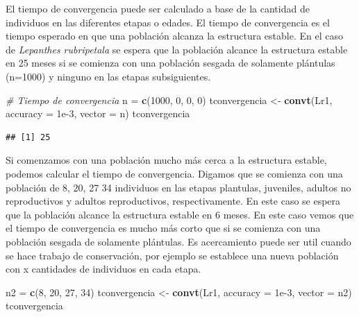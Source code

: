 \documentclass[
]{book}
\newenvironment{Shaded}{\begin{snugshade}}{\end{snugshade}}
\newcommand{\AttributeTok}[1]{\textcolor[rgb]{0.13,0.29,0.53}{#1}}
\newcommand{\CommentTok}[1]{\textcolor[rgb]{0.56,0.35,0.01}{\textit{#1}}}
\newcommand{\DecValTok}[1]{\textcolor[rgb]{0.00,0.00,0.81}{#1}}
\newcommand{\FloatTok}[1]{\textcolor[rgb]{0.00,0.00,0.81}{#1}}
\newcommand{\FunctionTok}[1]{\textcolor[rgb]{0.13,0.29,0.53}{\textbf{#1}}}
\newcommand{\NormalTok}[1]{#1}
\newcommand{\OtherTok}[1]{\textcolor[rgb]{0.56,0.35,0.01}{#1}}
\theoremstyle{definition}
\theoremstyle{definition}
\theoremstyle{definition}
\theoremstyle{definition}
\theoremstyle{remark}
\begin{document}
El tiempo de convergencia puede ser calculado a base de la cantidad de individuos en las diferentes etapas o edades. El tiempo de convergencia es el tiempo esperado en que una población alcanza la estructura estable. En el caso de \emph{Lepanthes rubripetala} se espera que la población alcance la estructura estable en 25 meses si se comienza con una población sesgada de solamente plántulas (n=1000) y ninguno en las etapas subsiguientes.

\begin{Shaded}
\begin{Highlighting}[]
\CommentTok{\# Tiempo de convergencia}
\NormalTok{n }\OtherTok{=} \FunctionTok{c}\NormalTok{(}\DecValTok{1000}\NormalTok{, }\DecValTok{0}\NormalTok{, }\DecValTok{0}\NormalTok{, }\DecValTok{0}\NormalTok{)}
\NormalTok{tconvergencia }\OtherTok{\textless{}{-}} \FunctionTok{convt}\NormalTok{(Lr1, }\AttributeTok{accuracy =} \FloatTok{1e{-}3}\NormalTok{, }\AttributeTok{vector =}\NormalTok{ n)}
\NormalTok{tconvergencia}
\end{Highlighting}
\end{Shaded}

\begin{verbatim}
## [1] 25
\end{verbatim}

Si comenzamos con una población mucho más cerca a la estructura estable, podemos calcular el tiempo de convergencia. Digamos que se comienza con una población de 8, 20, 27 34 individuos en las etapas plantulas, juveniles, adultos no reproductivos y adultos reproductivos, respectivamente. En este caso se espera que la población alcance la estructura estable en 6 meses. En este caso vemos que el tiempo de convergencia es mucho más corto que si se comienza con una población sesgada de solamente plántulas. Es acercamiento puede ser util cuando se hace trabajo de conservación, por ejemplo se establece una nueva población con x cantidades de individuos en cada etapa.

\begin{Shaded}
\begin{Highlighting}[]
\NormalTok{n2 }\OtherTok{=} \FunctionTok{c}\NormalTok{(}\DecValTok{8}\NormalTok{, }\DecValTok{20}\NormalTok{, }\DecValTok{27}\NormalTok{, }\DecValTok{34}\NormalTok{)}
\NormalTok{tconvergencia }\OtherTok{\textless{}{-}} \FunctionTok{convt}\NormalTok{(Lr1, }\AttributeTok{accuracy =} \FloatTok{1e{-}3}\NormalTok{, }\AttributeTok{vector =}\NormalTok{ n2)}
\NormalTok{tconvergencia}
\end{Highlighting}
\end{Shaded}
\end{document}
